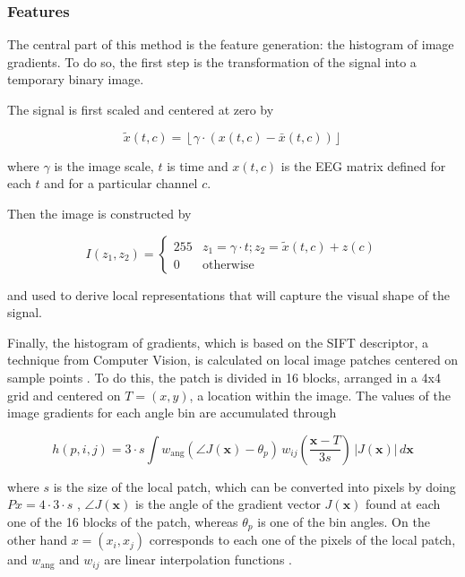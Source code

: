 \documentclass[entropy,article,submit,moreauthors,pdftex,10pt,a4paper]{mdpi}
\begin{document}
\subsubsection{Features}

The central part of this method is the feature generation: the histogram of image gradients.  To do so, the first step is the transformation of the signal into a temporary binary image.

The signal is first scaled and centered at zero by 

\begin{equation}
\tilde{x}(t,c) = \left \lfloor{ \gamma \cdot ( x(t,c) - \bar{x}(t,c)  )}\right \rfloor
\end{equation}

\noindent where $\gamma$ is the image scale, $t$ is time and $ x(t,c) $ is the EEG matrix defined for each $t$ and for a particular channel $c$.

Then the image is constructed by

\begin{equation}
I(z_1,z_2) = \left\{ \begin{array}{rl}
255 & z_1 = \gamma \cdot t; z_2 = \tilde{x}(t,c) + z(c) \\
0   & \mbox{otherwise}
\end{array}\right.
\label{eq:images}
\end{equation}

\noindent and used to derive local representations that will capture the visual shape of the signal.

Finally, the histogram of gradients, which is based on the SIFT \citep{Lowe2004} descriptor, a technique from Computer Vision, is calculated on local image patches centered on sample points \citep{Vedaldi2010}.
To do this, the patch is divided in 16 blocks, arranged in a 4x4 grid and centered on $T = (x,y)$, a location within the image. The values of the image gradients for each angle bin are accumulated through

\begin{equation}
 h(p,i,j) = 3 \cdot s \int w_\mathrm{ang}(\angle J(\mathbf{x}) - \theta_p)\, w_{ij}\left(\frac{\mathbf{x} - T}{3 s}\right)\, |J(\mathbf{x})|\, d\mathbf{x}
\label{eq:histogram}
\end{equation}

\noindent where $s$ is the size of the local patch, which can be converted into pixels by doing $ Px = 4 \cdot 3 \cdot s $ , $\angle J(\mathbf{x})$ is the angle of the gradient vector $ J(\mathbf{x}) $  found at each one of the 16 blocks of the patch, whereas  $\theta_p$ is one of the bin angles.  On the other hand $ x = (x_i, x_j) $ corresponds to each one of the pixels of the local patch, and $ w_\mathrm{ang}  $  and $ w_{ij} $ are linear interpolation functions \citep{Lowe2004}.
  
\end{document}
